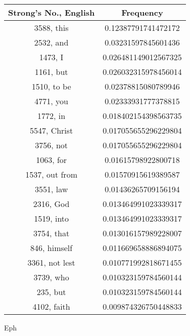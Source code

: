 \documentclass[12pt,letterpaper]{article}
\begin{document}
 \begin{longtable}{|c|c|}
\hline
 Strong's No., English & Frequency \\ \hline  
3588, this & 0.12387791741472172\\ \hline 
 2532, and & 0.03231597845601436\\ \hline 
 1473, I & 0.026481149012567325\\ \hline 
 1161, but & 0.026032315978456014\\ \hline 
 1510, to be & 0.02378815080789946\\ \hline 
 4771, you & 0.02333931777378815\\ \hline 
 1772, in & 0.018402154398563735\\ \hline 
 5547, Christ & 0.017055655296229804\\ \hline 
 3756, not & 0.017055655296229804\\ \hline 
 1063, for & 0.01615798922800718\\ \hline 
 1537, out from & 0.01570915619389587\\ \hline 
 3551, law & 0.01436265709156194\\ \hline 
 2316, God & 0.013464991023339317\\ \hline 
 1519, into & 0.013464991023339317\\ \hline 
 3754, that & 0.013016157989228007\\ \hline 
 846, himself & 0.011669658886894075\\ \hline 
 3361, not lest & 0.010771992818671455\\ \hline 
 3739, who & 0.010323159784560144\\ \hline 
 235, but & 0.010323159784560144\\ \hline 
 4102, faith & 0.009874326750448833\\ \hline 
\end{longtable} 
 

Eph
\end{document}

